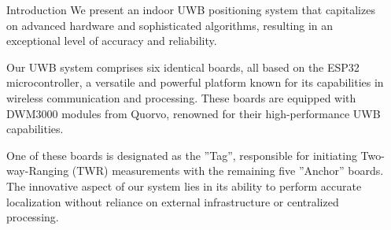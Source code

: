\documentclass[final]{beamer}
\newlength{\sepwidth}
\newlength{\colwidth}
\newcommand{\separatorcolumnwithoutline}{\begin{column}{\sepwidth}\end{column}}
\begin{document}
\begin{frame}[t]
\begin{columns}[t]
\separatorcolumnwithoutline

\begin{column}{\colwidth}

  \begin{block}{Introduction}
    We present an indoor UWB positioning system
    that capitalizes on advanced hardware and sophisticated algorithms,
    resulting in an exceptional level of accuracy and reliability.
  
    Our UWB system comprises six identical boards,
    all based on the ESP32 microcontroller, a versatile
    and powerful platform known for its capabilities in
    wireless communication and processing. These boards
    are equipped with DWM3000 modules from Quorvo,
    renowned for their high-performance UWB capabilities.

    One of these boards is designated as the ”Tag”, responsible for
    initiating Two-way-Ranging (TWR) measurements with the
    remaining five ”Anchor” boards.
    The innovative aspect of our system lies in its ability to perform accurate
    localization without reliance on external infrastructure
    or centralized processing.

    \begin{figure}[H]
      \centering
\end{figure}
\end{block}
\end{column}
\end{columns}
\end{frame}
\end{document}
